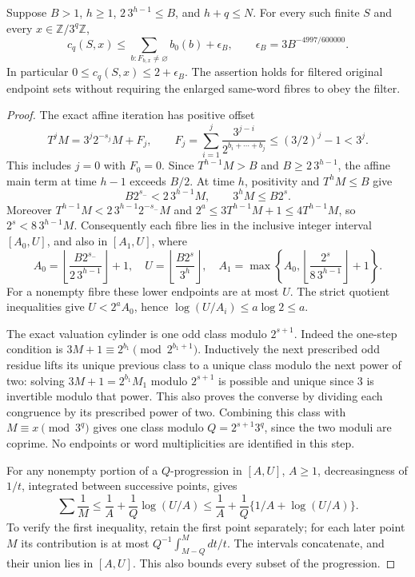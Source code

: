 \begin{proposition}
\label{prop:Mazur-native-coefficient}
Suppose $B>1$, $h\ge1$, $2\,3^{h-1}\le B$, and $h+q\le N$.
For every such finite $S$ and every $x\in\mathbb Z/3^q\mathbb Z$,
\begin{equation}
 c_q(S,x)\le\sum_{b:F_{b,x}\ne\varnothing}b_0(b)
             +\epsilon_B,\qquad
 \epsilon_B=3B^{-4997/600000}.
 \label{eq:Mazur-native-coefficient}
\end{equation}
In particular $0\le c_q(S,x)\le2+\epsilon_B$.
The assertion holds for filtered original endpoint sets without
requiring the enlarged same-word fibres to obey the filter.
\end{proposition}
\begin{proof}
The exact affine iteration has positive offset
\[
 T^jM=3^j2^{-s_j}M+F_j,\qquad
 F_j=\sum_{i=1}^j\frac{3^{j-i}}{2^{b_i+\cdots+b_j}}
 \le(3/2)^j-1<3^j .
\]
This includes $j=0$ with $F_0=0$.
Since $T^{h-1}M>B$ and $B\ge2\,3^{h-1}$, the affine main term
at time $h-1$ exceeds $B/2$. At time $h$, positivity and
$T^hM\le B$ give
\[
 B2^{s_-}<2\,3^{h-1}M,\qquad 3^hM\le B2^s .
\]
Moreover $T^{h-1}M<2\,3^{h-1}2^{-s_-}M$ and
$2^a\le3T^{h-1}M+1\le4T^{h-1}M$, so
$2^s<8\,3^{h-1}M$. Consequently each fibre lies in the inclusive
integer interval $[A_0,U]$, and also in $[A_1,U]$, where
\[
 A_0=\left\lfloor\frac{B2^{s_-}}{2\,3^{h-1}}\right\rfloor+1,\quad
 U=\left\lfloor\frac{B2^s}{3^h}\right\rfloor,\quad
 A_1=\max\left\{A_0,\left\lfloor\frac{2^s}{8\,3^{h-1}}\right\rfloor+1\right\}.
\]
For a nonempty fibre these lower endpoints are at most $U$.
The strict quotient inequalities give $U<2^aA_0$, hence
$\log(U/A_i)\le a\log2\le a$.

The exact valuation cylinder is one odd class modulo $2^{s+1}$.
Indeed the one-step condition is $3M+1\equiv2^{b_1}\pmod{2^{b_1+1}}$.
Inductively the next prescribed odd residue lifts its unique previous
class to a unique class modulo the next power of two: solving
$3M+1=2^{b_1}M_1$ modulo $2^{s+1}$ is possible and unique since
$3$ is invertible modulo that power. This also proves the converse
by dividing each congruence by its prescribed power of two.
Combining this class with $M\equiv x\pmod{3^q}$ gives one class
modulo $Q=2^{s+1}3^q$, since the two moduli are coprime.
No endpoints or word multiplicities are identified in this step.

For any nonempty portion of a $Q$-progression in $[A,U]$, $A\ge1$,
decreasingness of $1/t$, integrated between successive points, gives
\[
 \sum\frac1M\le\frac1A+\frac1Q\log(U/A)
 \le\frac1A+\frac1Q\{1/A+\log(U/A)\}.
\]
To verify the first inequality, retain the first point separately;
for each later point $M$ its contribution is at most
$Q^{-1}\int_{M-Q}^M dt/t$. The intervals concatenate, and their
union lies in $[A,U]$. This also bounds every subset of the progression.


\end{proof}

